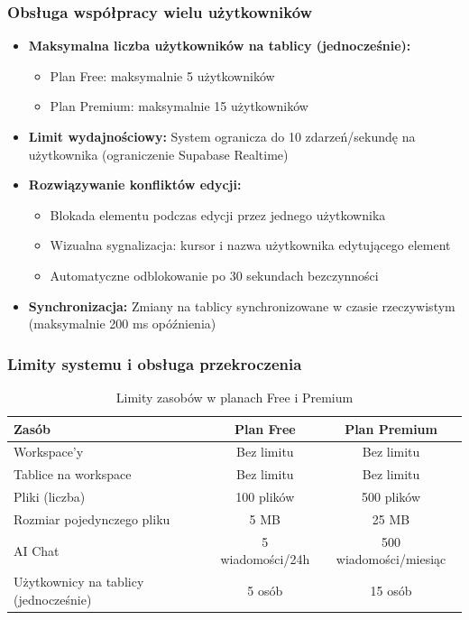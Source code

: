 \documentclass[12pt,a4paper]{article}
\begin{document}
\subsubsection{Obsługa współpracy wielu użytkowników}

\begin{itemize}[leftmargin=*]
    \item \textbf{Maksymalna liczba użytkowników na tablicy (jednocześnie):}
    \begin{itemize}
        \item Plan Free: maksymalnie 5 użytkowników
        \item Plan Premium: maksymalnie 15 użytkowników
    \end{itemize}
    \item \textbf{Limit wydajnościowy:} System ogranicza do 10 zdarzeń/sekundę na użytkownika (ograniczenie Supabase Realtime)
    \item \textbf{Rozwiązywanie konfliktów edycji:}
    \begin{itemize}
        \item Blokada elementu podczas edycji przez jednego użytkownika
        \item Wizualna sygnalizacja: kursor i nazwa użytkownika edytującego element
        \item Automatyczne odblokowanie po 30 sekundach bezczynności
    \end{itemize}
    \item \textbf{Synchronizacja:} Zmiany na tablicy synchronizowane w czasie rzeczywistym (maksymalnie 200 ms opóźnienia)
\end{itemize}

\subsubsection{Limity systemu i obsługa przekroczenia}

\begin{table}[H]
\centering
\begin{tabular}{|l|c|c|}
\hline
\textbf{Zasób} & \textbf{Plan Free} & \textbf{Plan Premium} \\ \hline
Workspace'y & Bez limitu & Bez limitu \\ \hline
Tablice na workspace & Bez limitu & Bez limitu \\ \hline
Pliki (liczba) & 100 plików & 500 plików \\ \hline
Rozmiar pojedynczego pliku & 5 MB & 25 MB \\ \hline
AI Chat & 5 wiadomości/24h & 500 wiadomości/miesiąc \\ \hline
Użytkownicy na tablicy (jednocześnie) & 5 osób & 15 osób \\ \hline
\end{tabular}
\caption{Limity zasobów w planach Free i Premium}
\label{tab:limity_zasobow}
\end{table}
\end{document}
